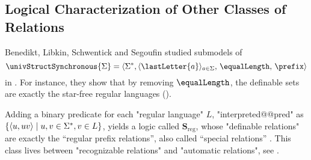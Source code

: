 \subsection{Logical Characterization of Other Classes of Relations}

Benedikt, Libkin, Schwentick and Segoufin studied submodels of
\[\univStructSynchronous{\Sigma} =
\tup{\Sigma^*, \langle\lastLetter{a}\rangle_{a \in \Sigma},\, \equalLength,\, \prefix}\]
in \cite{BenediktLibkinSchwentickSegoufin2003DefinableRelations}.
For instance, they show that by removing $\equalLength$, the definable sets are exactly
the star-free regular languages
(\cite[Corollary 3.7]{BenediktLibkinSchwentickSegoufin2003DefinableRelations}).

Adding a binary predicate for each "regular language" $L$, "interpreted@@pred"
as $\{\langle u,uv\rangle \mid u,v \in \Sigma^*, v \in L \}$, yields
a logic called $\symbf{S}_{\mathrm{reg}}$, whose "definable relations"
are exactly the ``regular prefix relations'', also called ``special relations''
\cite[Corollary 3.22]{BenediktLibkinSchwentickSegoufin2003DefinableRelations}.
This class lives between "recognizable relations" and "automatic relations",
see \cite[\S~``1984'']{Choffrut2006Survey}.